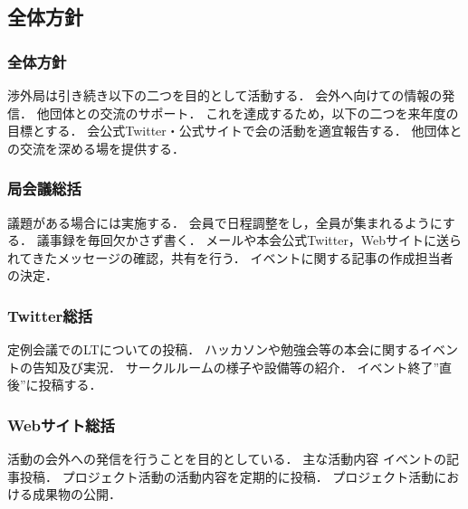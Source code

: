 \subsection*{全体方針}


\subsubsection*{全体方針}

渉外局は引き続き以下の二つを目的として活動する．
    会外へ向けての情報の発信．
    他団体との交流のサポート．
これを達成するため，以下の二つを来年度の目標とする．
    会公式Twitter・公式サイトで会の活動を適宜報告する．
    他団体との交流を深める場を提供する．



\subsubsection*{局会議総括}

議題がある場合には実施する．
会員で日程調整をし，全員が集まれるようにする．
議事録を毎回欠かさず書く．
メールや本会公式Twitter，Webサイトに送られてきたメッセージの確認，共有を行う．
イベントに関する記事の作成担当者の決定．


\subsubsection*{Twitter総括}

定例会議でのLTについての投稿．
ハッカソンや勉強会等の本会に関するイベントの告知及び実況．
サークルルームの様子や設備等の紹介．
イベント終了”直後”に投稿する．


\subsubsection*{Webサイト総括}

活動の会外への発信を行うことを目的としている．
主な活動内容
    イベントの記事投稿．
    プロジェクト活動の活動内容を定期的に投稿．
    プロジェクト活動における成果物の公開．

